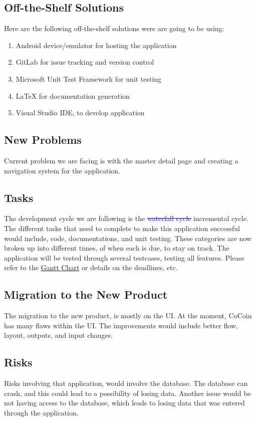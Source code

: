 \documentclass[12pt, titlepage]{article}
\begin{document}
\subsection{Off-the-Shelf Solutions}
Here are the following off-the-shelf solutions were are going to be using: 
   \begin{enumerate}
     \item Android device/emulator for hosting the application 
     \item GitLab for issue tracking and version control
	\item Microsoft Unit Test Framework for unit testing 
	 \item LaTeX for documentation generation
	\item Visual Studio IDE, to develop application

   \end{enumerate}

\subsection{New Problems}
Current problem we are facing is with the master detail page and creating a navigation system for the application.
\subsection{Tasks}
The development cycle we are following is the \textcolor{blue}{\st{waterfall cycle}} incremental cycle. The different tasks that need to complete to make this application successful would include, code, documentations, and unit testing. These categories are now broken up into different times, of when each is due, to stay on track. The application will be tested through several testcases, testing all features. Please refer to the \href{run:../../ProjectSchedule/Team 12 Gantt Chart.gan}{Gantt Chart} or details on the deadlines, etc.
\subsection{Migration to the New Product}
The migration to the new product, is mostly on the UI. At the moment, CoCoin has many flaws within the UI. The improvements would include better flow, layout, outputs, and input changes. 
\subsection{Risks}
Risks involving that application, would involve the database. The database can crash, and this could lead to a possibility of losing data. Another issue would be not having access to the database, which leads to losing data that was entered through the application.
\end{document}
